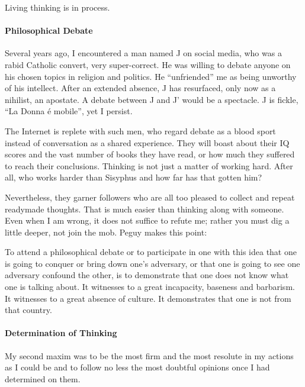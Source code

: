 Living thinking is in process.

\paragraph{Philosophical Debate}


Several years ago, I encountered a man named J on social media, who was a rabid Catholic convert, very super-correct. He was willing to debate anyone on his chosen topics in religion and politics. He ``unfriended'' me as being unworthy of his intellect. After an extended absence, J has resurfaced, only now as a nihilist, an apostate. A debate between J and J' would be a spectacle. J is fickle, ``La Donna é mobile'', yet I persist.

The Internet is replete with such men, who regard debate as a blood sport instead of conversation as a shared experience. They will boast about their IQ scores and the vast number of books they have read, or how much they suffered to reach their conclusions. Thinking is not just a matter of working hard. After all, who works harder than Sisyphus and how far has that gotten him?

Nevertheless, they garner followers who are all too pleased to collect and repeat readymade thoughts. That is much easier than thinking along with someone. Even when I am wrong, it does not suffice to refute me; rather you must dig a little deeper, not join the mob. Peguy makes this point:

\begin{quotex}
To attend a philosophical debate or to participate in one with this idea that one is going to conquer or bring down one's adversary, or that one is going to see one adversary confound the other, is to demonstrate that one does not know what one is talking about. It witnesses to a great incapacity, baseness and barbarism. It witnesses to a great absence of culture. It demonstrates that one is not from that country.
\end{quotex}


\paragraph{Determination of Thinking}


\begin{quotex}
My second maxim was to be the most firm and the most resolute in my actions as I could be and to follow no less the most doubtful opinions once I had determined on them.
\end{quotex}


